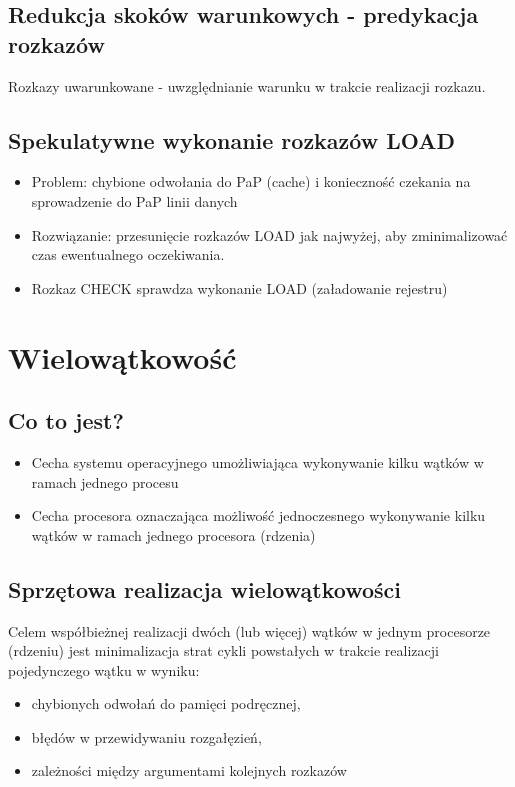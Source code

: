 \documentclass[a4paper,twoside]{article}
\begin{document}
		\subsection*{Redukcja skoków warunkowych - predykacja rozkazów}
		Rozkazy uwarunkowane - uwzględnianie warunku w trakcie realizacji rozkazu.
		\subsection*{Spekulatywne wykonanie rozkazów LOAD}
		\begin{itemize}
			\item Problem: chybione odwołania do PaP (cache) i konieczność czekania na sprowadzenie do PaP linii danych
			\item Rozwiązanie: przesunięcie rozkazów LOAD jak najwyżej, aby zminimalizować czas ewentualnego oczekiwania.
			\item Rozkaz CHECK sprawdza wykonanie LOAD (załadowanie rejestru)
		\end{itemize}
		
	\section*{Wielowątkowość}
		\subsection*{Co to jest?}
		\begin{itemize}
			\item Cecha systemu operacyjnego umożliwiająca wykonywanie kilku wątków w ramach jednego procesu
			\item Cecha procesora oznaczająca możliwość jednoczesnego wykonywanie kilku wątków w ramach jednego procesora (rdzenia)
		\end{itemize}
		\subsection*{Sprzętowa realizacja wielowątkowości}
		Celem współbieżnej realizacji dwóch (lub więcej) wątków w jednym procesorze (rdzeniu) jest minimalizacja strat cykli powstałych w trakcie realizacji pojedynczego wątku w wyniku:
		\begin{itemize}
			\item chybionych odwołań do pamięci podręcznej,
			\item błędów w przewidywaniu rozgałęzień,
			\item zależności między argumentami kolejnych rozkazów
		\end{itemize}
\end{document}
